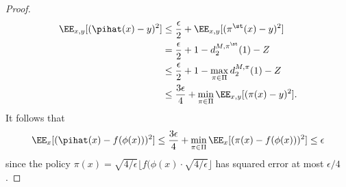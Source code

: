 \begin{proof}
\begin{align*}
\EE_{x,y}[(\pihat(x)-y)^2]
&\leq \frac{\epsilon}{2} + \EE_{x,y}[(\pi^\st(x) - y)^2] \\ 
&= \frac{\epsilon}{2} + 1-d^{M,\pi^\st}_2(1) - Z \\ 
&\leq \frac{\epsilon}{2} + 1 - \max_{\pi\in\Pi} d^{M,\pi}_2(1) - Z \\ 
&\leq \frac{3\epsilon}{4} + \min_{\pi\in\Pi} \EE_{x,y}[(\pi(x)-y)^2].
\end{align*}
It follows that
\[\EE_x[(\pihat(x) - f(\phi(x)))^2] \leq \frac{3\epsilon}{4} + \min_{\pi\in\Pi} \EE_x[(\pi(x)-f(\phi(x)))^2] \leq \epsilon\]
since the policy $\pi(x) = \sqrt{4/\epsilon} \lfloor f(\phi(x) \cdot \sqrt{4/\epsilon}\rfloor$ has squared error at most $\epsilon/4$.
\end{proof}
